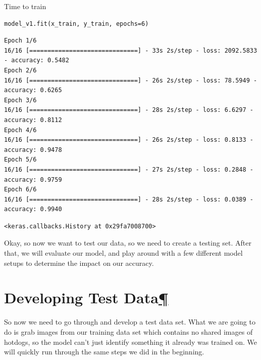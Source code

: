 \documentclass[
]{article}
\begin{document}
Time to train

\begin{Verbatim}[frame=single]
model_v1.fit(x_train, y_train, epochs=6)
\end{Verbatim}

\begin{verbatim}
Epoch 1/6
16/16 [==============================] - 33s 2s/step - loss: 2092.5833 - accuracy: 0.5482
Epoch 2/6
16/16 [==============================] - 26s 2s/step - loss: 78.5949 - accuracy: 0.6265
Epoch 3/6
16/16 [==============================] - 28s 2s/step - loss: 6.6297 - accuracy: 0.8112
Epoch 4/6
16/16 [==============================] - 26s 2s/step - loss: 0.8133 - accuracy: 0.9478
Epoch 5/6
16/16 [==============================] - 27s 2s/step - loss: 0.2848 - accuracy: 0.9759
Epoch 6/6
16/16 [==============================] - 28s 2s/step - loss: 0.0389 - accuracy: 0.9940
\end{verbatim}

\begin{verbatim}
<keras.callbacks.History at 0x29fa7008700>
\end{verbatim}

Okay, so now we want to test our data, so we need to create a testing
set. After that, we will evaluate our model, and play around with a few
different model setups to determine the impact on our accuracy.

\hypertarget{Developing-Test-Data}{%
\section{\texorpdfstring{Developing Test
Data\protect\hyperlink{Developing-Test-Data}{¶}}{Developing Test Data¶}}\label{Developing-Test-Data}}

So now we need to go through and develop a test data set. What we are
going to do is grab images from our training data set which contains no
shared images of hotdogs, so the model can't just identify something it
already was trained on. We will quickly run through the same steps we
did in the beginning.
\end{document}
